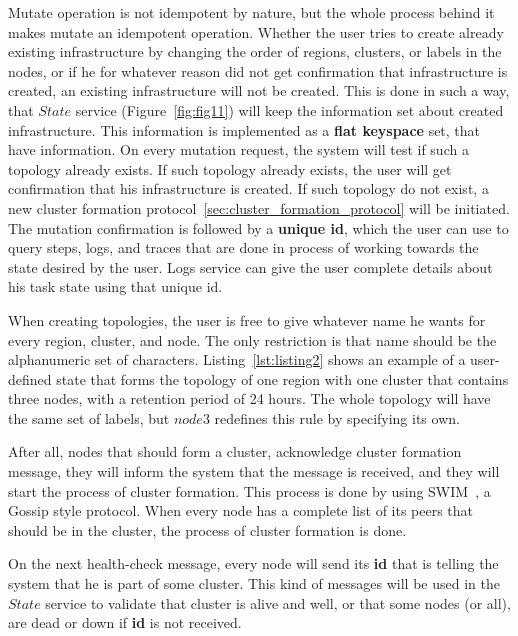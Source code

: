 Mutate operation is not idempotent by nature, but the whole process behind it makes mutate an idempotent operation. Whether the user tries to create already existing infrastructure by changing the order of regions, clusters, or labels in the nodes, or if he for whatever reason did not get confirmation that infrastructure is created, an existing infrastructure will not be created. This is done in such a way, that $State$ service (Figure~\ref{fig:fig11}) will keep the information set about created infrastructure. This information is implemented as a \textbf{flat keyspace} set, that have information. On every mutation request, the system will test if such a topology already exists. If such topology already exists, the user will get confirmation that his infrastructure is created. If such topology do not exist, a new cluster formation protocol~\ref{sec:cluster_formation_protocol} will be initiated. The mutation confirmation is followed by a \textbf{unique id}, which the user can use to query steps, logs, and traces that are done in process of working towards the state desired by the user. Logs service can give the user complete details about his task state using that unique id.

When creating topologies, the user is free to give whatever name he wants for every region, cluster, and node. The only restriction is that name should be the alphanumeric set of characters. Listing~\ref{lst:listing2} shows an example of a user-defined state that forms the topology of one region with one cluster that contains three nodes, with a retention period of 24 hours. The whole topology will have the same set of labels, but $node3$ redefines this rule by specifying its own.



\noindent
After all, nodes that should form a cluster, acknowledge cluster formation message, they will inform the system that the message is received, and they will start the process of cluster formation. This process is done by using SWIM~\cite{DasGM02}, a Gossip style protocol. When every node has a complete list of its peers that should be in the cluster, the process of cluster formation is done. 

On the next health-check message, every node will send its \textbf{id} that is telling the system that he is part of some cluster. This kind of messages will be used in the $State$ service to validate that cluster is alive and well, or that some nodes (or all), are dead or down if \textbf{id} is not received. 

